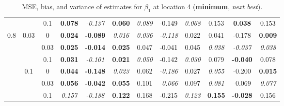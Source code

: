 \documentclass[authoryear, review, 11pt]{elsarticle}
\begin{document}
\begin{table}[ht]
\begin{center}
\begin{tabular}{ccc | ccc | ccc | ccc }
		 &  & 0.1 &   \textbf{0.078} & \emph{-0.137} & \textbf{0.060} & \emph{0.089} & -0.149 & \emph{0.068} & 0.153 & \textbf{0.038} & 0.153 \\ \cline{1-12}
		\multirow{6}{*}{0.8} & \multirow{3}{*}{0.03} & 0 &   \textbf{0.024} & \textbf{-0.089} & \emph{0.016} & \emph{0.036} & \emph{-0.118} & 0.022 & 0.041 & -0.178 & \textbf{0.009} \\ 
		 &  & 0.03 &   \textbf{0.025} & \textbf{-0.014} & \textbf{0.025} & 0.047 & -0.041 & 0.045 & \emph{0.038} & \emph{-0.037} & \emph{0.038} \\ 
		 &  & 0.1 &   \textbf{0.031} & \emph{-0.101} & \textbf{0.021} & \emph{0.050} & -0.142 & \emph{0.030} & 0.079 & \textbf{-0.040} & 0.078 \\ \cline{2-12}
		 & \multirow{3}{*}{0.1} & 0 &   \textbf{0.044} & \textbf{-0.148} & \emph{0.023} & 0.062 & \emph{-0.186} & 0.027 & \emph{0.055} & -0.200 & \textbf{0.015} \\ 
		 &  & 0.03 &   \textbf{0.056} & \textbf{-0.042} & \textbf{0.055} & 0.101 & \emph{-0.066} & 0.097 & \emph{0.081} & -0.069 & \emph{0.077} \\ 
		 &  & 0.1 &   \emph{0.157} & \emph{-0.188} & \textbf{0.122} & 0.168 & -0.215 & \emph{0.123} & \textbf{0.155} & \textbf{-0.028} & 0.156 \\ 
		  \end{tabular}
		\caption{MSE, bias, and variance of estimates for $\beta_1$ at location 4 (\textbf{minimum}, \emph{next best}).\label{table:loc4-estimation}}
		\end{center}
		\end{table}

		
		
\end{document}
